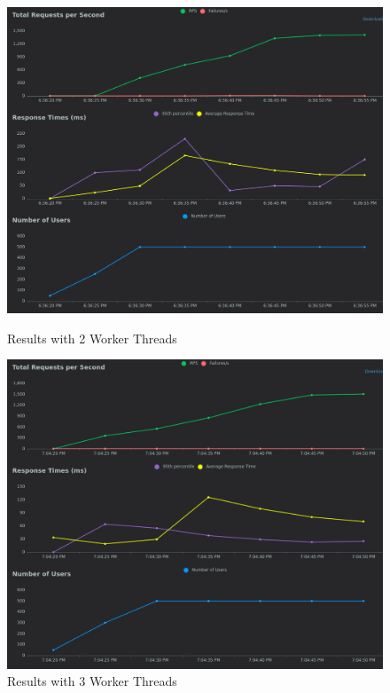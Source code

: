 \begin{figure}[h]
    \centering
    \begin{minipage}{0.45\textwidth}
        \centering
        \includegraphics[width=\textwidth]{figures/2threads.png}
        \caption{Results with 2 Worker Threads}
    \end{minipage}
    \hfill
    \begin{minipage}{0.45\textwidth}
        \centering
        \includegraphics[width=\textwidth]{figures/3threads.png}
        \caption{Results with 3 Worker Threads}
    \end{minipage}
\end{figure}


